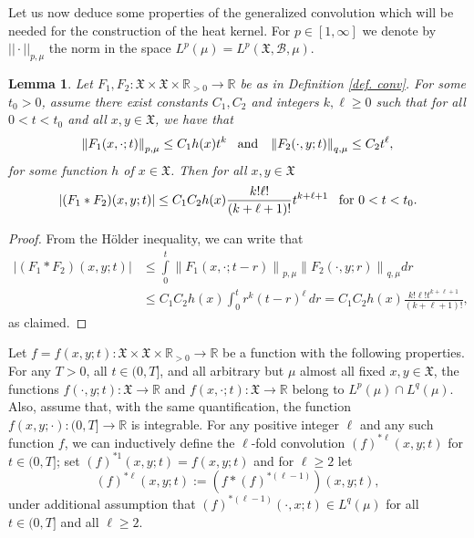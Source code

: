 \documentclass[11pt,reqno]{amsart}
\newtheorem{lemma}[theorem]{Lemma}
\theoremstyle{remark}
\theoremstyle{definition}
\numberwithin{theorem}{section} \numberwithin{equation}{section}
\newcommand{\X}{\mathfrak{X}}
\begin{document}
Let us now deduce some properties of the generalized convolution which will be needed for the construction of the heat kernel.
For $p\in [1,\infty]$ we denote by $||\cdot||_{p,\mu}$ the norm in the space $L^p(\mu)=L^p(\X,\mathcal{B},\mu)$.

\begin{lemma}
\label{lem:convolution bounds} Let $F_{1},F_{2}:\X\times \X\times\mathbb{R}_{>0}\to\mathbb{R}$
be as in Definition \ref{def. conv}.  For some $t_{0} > 0$, assume there exist constants $C_1, C_2$ and integers $k,\ell\geq 0$
such that for all $0<t<t_{0}$ and all $x,y \in \X$, we have that
$$
\left\|F_{1}(x,\cdot;t)\right\|_{p,\mu}\leq C_{1}h(x)t^{k}
  \,\,\,\,\,
  \text{\rm and}
  \,\,\,\,\,
  \left\|F_{2}(\cdot, y;t)\right\|_{q,\mu}\leq C_{2}t^{\ell},
$$
for some function $h$  of $x\in\X$.
Then for all $x,y\in \X$
\[
  |(F_{1}\ast F_{2})(x,y;t)|\leq C_{1}C_{2}h(x)\frac{k!\ell!}{(k+\ell+1)!}
  t^{k+\ell+1}
  \,\,\,\,\,
  \text{\rm for $0<t<t_{0}$.}
\]
\end{lemma}

\begin{proof}
From the H\" older inequality, we can write that
\begin{align*}
|(F_{1}\ast F_{2})(x,y;t)|&\leq \int\limits _{0}^{t} \left\| F_1(x,\cdot;t-r)\right\|_{p,\mu} \left\| F_2(\cdot, y;r)\right\|_{q,\mu}dr\\
&\leq C_1C_2h(x)\int_0^t r^k (t-r)^\ell\, dr=C_1C_2h(x)\frac{k!\ell!t^{k+\ell+1}}{(k+\ell+1)!},
\end{align*}
as claimed.
\end{proof}

Let $f=f(x,y;t):\X\times \X\times\mathbb{R}_{>0}\to\mathbb{R}$ be a function with the following properties.  For any  $T>0$, all $t\in (0,T]$,
and all arbitrary but $\mu$ almost all fixed $x,y\in \X$, the functions $f(\cdot, y;t): \X \to \mathbb{R} $ and $f(x,\cdot;t): \X \to \mathbb{R} $
belong to $L^p(\mu)\cap L^q(\mu)$.  Also, assume that, with the same quantification, the function $f(x,y;\cdot) :(0,T] \to \mathbb{R}$ is integrable.
For any positive integer $\ell$ and any such function $f$, we can inductively define the $\ell$-fold
convolution $(f)^{\ast\ell}(x,y;t)$ for $t\in(0,T]$; set $(f)^{\ast1}(x,y;t)=f(x,y;t)$
and for $\ell\geq2$ let
$$
(f)^{\ast\ell}(x,y;t):=\left(f\ast(f)^{\ast(\ell-1)}\right)(x,y;t),
$$
under additional assumption that $(f)^{\ast(\ell-1)}(\cdot,x;t)\in L^q(\mu)$ for all $t\in(0,T]$ and all $\ell \geq 2$.
\end{document}
